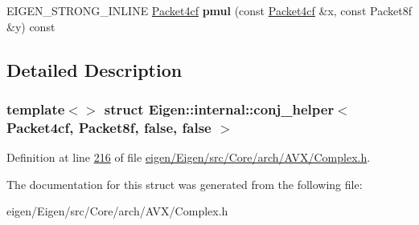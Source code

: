 \begin{DoxyCompactItemize}
\item 
\mbox{\label{struct_eigen_1_1internal_1_1conj__helper_3_01_packet4cf_00_01_packet8f_00_01false_00_01false_01_4_a2f0554d7810c3b59f9c935e08159331e}} 
E\+I\+G\+E\+N\+\_\+\+S\+T\+R\+O\+N\+G\+\_\+\+I\+N\+L\+I\+NE \hyperlink{struct_eigen_1_1internal_1_1_packet4cf}{Packet4cf} {\bfseries pmul} (const \hyperlink{struct_eigen_1_1internal_1_1_packet4cf}{Packet4cf} \&x, const Packet8f \&y) const
\end{DoxyCompactItemize}


\subsection{Detailed Description}
\subsubsection*{template$<$$>$\newline
struct Eigen\+::internal\+::conj\+\_\+helper$<$ Packet4cf, Packet8f, false, false $>$}



Definition at line \hyperlink{eigen_2_eigen_2src_2_core_2arch_2_a_v_x_2_complex_8h_source_l00216}{216} of file \hyperlink{eigen_2_eigen_2src_2_core_2arch_2_a_v_x_2_complex_8h_source}{eigen/\+Eigen/src/\+Core/arch/\+A\+V\+X/\+Complex.\+h}.



The documentation for this struct was generated from the following file\+:\begin{DoxyCompactItemize}
\item 
eigen/\+Eigen/src/\+Core/arch/\+A\+V\+X/\+Complex.\+h\end{DoxyCompactItemize}
